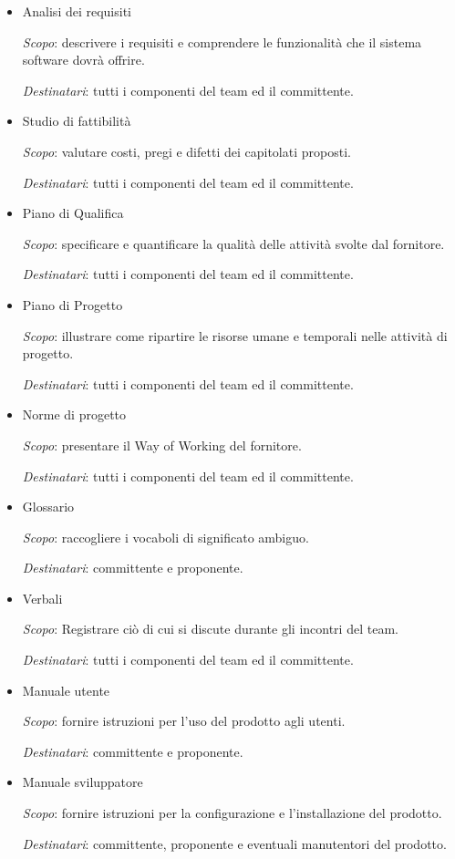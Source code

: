 \documentclass[../../norme-di-progetto.tex]{subfiles}
\begin{document}
\begin{itemize}
  \item Analisi dei requisiti

        \textit{Scopo}: descrivere i requisiti e comprendere le funzionalità che il sistema software dovrà offrire.

        \textit{Destinatari}: tutti i componenti del team ed il committente.


  \item Studio di fattibilità

        \textit{Scopo}: valutare costi, pregi e difetti dei capitolati proposti.

        \textit{Destinatari}: tutti i componenti del team ed il committente.


  \item Piano di Qualifica

        \textit{Scopo}: specificare e quantificare la qualità delle attività svolte dal fornitore.

        \textit{Destinatari}: tutti i componenti del team ed il committente.


  \item Piano di Progetto

        \textit{Scopo}: illustrare come ripartire le risorse umane e temporali nelle attività di progetto.

        \textit{Destinatari}: tutti i componenti del team ed il committente.


  \item Norme di progetto

        \textit{Scopo}: presentare il Way of Working del fornitore.

        \textit{Destinatari}: tutti i componenti del team ed il committente.

  \item Glossario

        \textit{Scopo}: raccogliere i vocaboli di significato ambiguo.

        \textit{Destinatari}: committente e proponente.


  \item Verbali

        \textit{Scopo}: Registrare ciò di cui si discute durante gli incontri del team.

        \textit{Destinatari}: tutti i componenti del team ed il committente.

  \item Manuale utente

        \textit{Scopo}: fornire istruzioni per l'uso del prodotto agli utenti.

        \textit{Destinatari}: committente e proponente.

  \item Manuale sviluppatore

        \textit{Scopo}: fornire istruzioni per la configurazione e l'installazione del prodotto.

        \textit{Destinatari}: committente, proponente e eventuali manutentori del prodotto.

\end{itemize}
\end{document}
